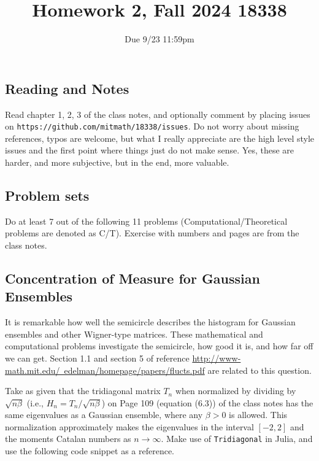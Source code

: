 \documentclass{article}
\title{Homework 2, Fall 2024 18338}
\author{Due 9/23 11:59pm}
\date{}
\begin{document}
\maketitle



\subsection*{Reading and Notes}
Read chapter 1, 2, 3 of the class notes, and optionally comment  by placing  issues on \verb+https://github.com/mitmath/18338/issues+.
Do not worry about missing references, typos are welcome, but what I really appreciate are
the high level style issues and the first point where things just do  not make sense.
Yes, these are harder, and more subjective, but in the end, more valuable.


\subsection*{Problem sets}
Do at least 7 out of the following 11 problems (Computational/Theoretical problems are denoted as C/T). Exercise with numbers and pages are from the class notes.

\subsection*{Concentration of Measure for Gaussian Ensembles}

It is remarkable how well the semicircle describes the histogram for Gaussian ensembles and other Wigner-type matrices. These mathematical and computational problems investigate the semicircle, how good it is, and how far off we can get. Section 1.1 and section 5 of reference \href{http://www-math.mit.edu/~edelman/homepage/papers/flucts.pdf}{http://www-math.mit.edu/~edelman/homepage/papers/flucts.pdf} are related to this question.

Take as given that the tridiagonal matrix $T_n$ when normalized by dividing by $\sqrt{n \beta }$ (i.e., $H_n = T_n/\sqrt{n \beta }$) on Page 109 (equation (6.3)) of the class notes has the same eigenvalues as a Gaussian ensemble, where any $\beta>0$ is allowed. 
This normalization approximately makes the 
eigenvalues in the interval $[-2,2]$ and the moments  Catalan numbers as $n \rightarrow \infty$.
Make use of \verb|Tridiagonal| in Julia, and use the following code snippet as a reference.
\end{document}
